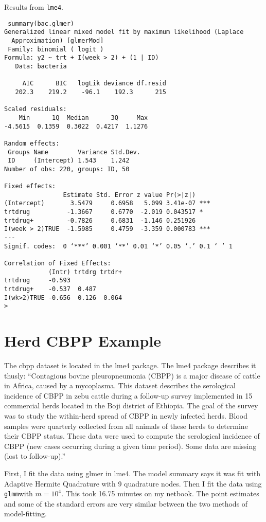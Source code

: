 \documentclass{article}
\begin{document}
Results from \texttt{lme4}.
\begin{verbatim}
 summary(bac.glmer)
Generalized linear mixed model fit by maximum likelihood (Laplace
  Approximation) [glmerMod]
 Family: binomial ( logit )
Formula: y2 ~ trt + I(week > 2) + (1 | ID)
   Data: bacteria

     AIC      BIC   logLik deviance df.resid 
   202.3    219.2    -96.1    192.3      215 

Scaled residuals: 
    Min      1Q  Median      3Q     Max 
-4.5615  0.1359  0.3022  0.4217  1.1276 

Random effects:
 Groups Name        Variance Std.Dev.
 ID     (Intercept) 1.543    1.242   
Number of obs: 220, groups: ID, 50

Fixed effects:
                Estimate Std. Error z value Pr(>|z|)    
(Intercept)       3.5479     0.6958   5.099 3.41e-07 ***
trtdrug          -1.3667     0.6770  -2.019 0.043517 *  
trtdrug+         -0.7826     0.6831  -1.146 0.251926    
I(week > 2)TRUE  -1.5985     0.4759  -3.359 0.000783 ***
---
Signif. codes:  0 ‘***’ 0.001 ‘**’ 0.01 ‘*’ 0.05 ‘.’ 0.1 ‘ ’ 1

Correlation of Fixed Effects:
            (Intr) trtdrg trtdr+
trtdrug     -0.593              
trtdrug+    -0.537  0.487       
I(wk>2)TRUE -0.656  0.126  0.064
> 
\end{verbatim}

\section{Herd CBPP Example}
The cbpp dataset is located in the lme4 package. The lme4 package describes it thusly: ``Contagious bovine pleuropneumonia (CBPP) is a major disease of cattle in Africa, caused by a
mycoplasma. This dataset describes the serological incidence of CBPP in zebu cattle during a
follow-up survey implemented in 15 commercial herds located in the Boji district of Ethiopia. The
goal of the survey was to study the within-herd spread of CBPP in newly infected herds. Blood
samples were quarterly collected from all animals of these herds to determine their CBPP status.
These data were used to compute the serological incidence of CBPP (new cases occurring during a given time period). Some data are missing (lost to follow-up).''

First, I fit the data using glmer in lme4. The model summary says it was fit with Adaptive Hermite Quadrature with 9 quadrature nodes. Then I fit the data using \texttt{glmm}with $m=10^4$. This took 16.75 minutes on my netbook. The point estimates and some of the standard errors are very similar between the two  methods of model-fitting. 
\end{document}
